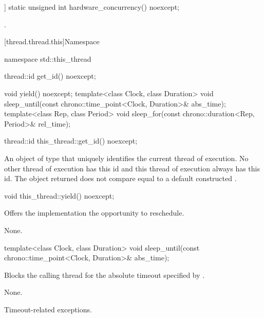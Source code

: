 %
\begin{itemdecl}
[[nodiscard]] static unsigned int hardware_concurrency() noexcept;
\end{itemdecl}

\begin{itemdescr}
\pnum
\returns
{}.
\end{itemdescr}


[thread.thread.this]{Namespace }

\begin{codeblock}
namespace std::this_thread {
  thread::id get_id() noexcept;

  void yield() noexcept;
  template<class Clock, class Duration>
    void sleep_until(const chrono::time_point<Clock, Duration>& abs_time);
  template<class Rep, class Period>
    void sleep_for(const chrono::duration<Rep, Period>& rel_time);
}
\end{codeblock}

%
\begin{itemdecl}
thread::id this_thread::get_id() noexcept;
\end{itemdecl}

\begin{itemdescr}
\pnum
\returns
An object of type  that uniquely identifies the current thread of
execution. No other thread of execution has this id and this thread of execution
always has this id. The object returned does not compare equal to a default constructed
.
\end{itemdescr}

%
\begin{itemdecl}
void this_thread::yield() noexcept;
\end{itemdecl}

\begin{itemdescr}
\pnum
\effects
Offers the implementation the opportunity to reschedule.

\pnum
\sync
None.
\end{itemdescr}

%
\begin{itemdecl}
template<class Clock, class Duration>
  void sleep_until(const chrono::time_point<Clock, Duration>& abs_time);
\end{itemdecl}

\begin{itemdescr}
\pnum
{}%
\effects
Blocks the calling thread for the absolute timeout specified
by .

\pnum
\sync
None.

\pnum
\throws
Timeout-related exceptions.
\end{itemdescr}

